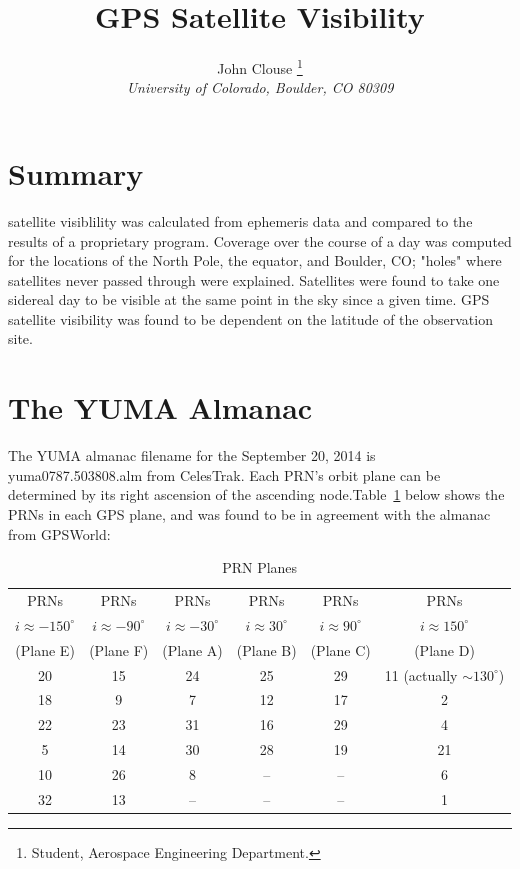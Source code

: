 \documentclass[paper]{aiaaNew}
\title{GPS Satellite Visibility}
\author{
%
John Clouse%
%
  \thanks{Student,  
  Aerospace Engineering Department.}
  \\
  \emph{\normalsize University of Colorado, Boulder, CO 80309}
}
\begin{document}
\maketitle
\pagebreak
\section{Summary}
 satellite visiblility was calculated from ephemeris data and compared to the results of a proprietary program.   Coverage over the course of a day was computed for the locations of the North Pole, the equator, and Boulder, CO; "holes" where satellites never passed through were explained. Satellites were found to take one sidereal day to be visible at the same point in the sky since a given time.  GPS satellite visibility was found to be dependent on the latitude of the observation site.

\section{The YUMA Almanac}
The YUMA almanac filename for the September 20, 2014 is yuma0787.503808.alm from CelesTrak. Each PRN's orbit plane can be determined by its right ascension of the ascending node.Table~\ref{PRNPlanes} below shows the PRNs in each GPS plane, and was found to be in agreement with the almanac from GPSWorld\cite{GPSWorldAlm}:

\begin{table}[H]
\centering

\begin{tabular}{|c|c|c|c|c|c|}  
\hline
PRNs & PRNs & PRNs & PRNs & PRNs & PRNs\\
$i\approx-150^{\circ}$ & $i\approx-90^{\circ}$ & $i\approx-30^{\circ}$ & $i\approx30^{\circ}$ & $i\approx90^{\circ}$ & $i\approx150^{\circ}$\\
(Plane E) & (Plane F) & (Plane A) & (Plane B) & (Plane C) & (Plane D)\\
\hline\hline
20 & 15 & 24 & 25 & 29 & 11 (actually $\sim130^{\circ}$)\\  
\hline
18 & 9 & 7 & 12 & 17 & 2\\
\hline
22 & 23 & 31 & 16 & 29 & 4\\
\hline
5 & 14 & 30 & 28 & 19 & 21\\
\hline
10 & 26 & 8 & -- & -- & 6\\
\hline
32 & 13 & -- & -- & -- & 1\\
\hline
\end{tabular}

\caption{PRN Planes}
\label{PRNPlanes}
\end{table}
\end{document}
